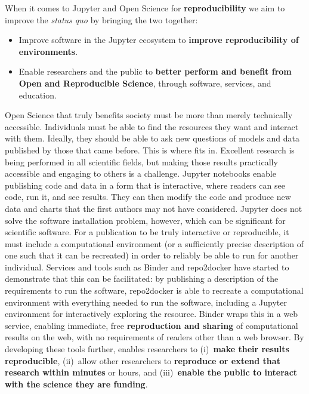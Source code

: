 When it comes to Jupyter and Open Science for \textbf{reproducibility} we aim to improve the
\textit{status quo} by bringing the two together:

\begin{itemize}
\item Improve software in the Jupyter ecosystem to \textbf{improve reproducibility of environments}.
\item Enable researchers and the public to \textbf{better perform and benefit
  from Open and Reproducible Science}, through software, services, and education.
\end{itemize}


Open Science that truly benefits society must be more than merely
technically accessible.  Individuals must be able to find the
resources they want and interact with them.  Ideally, they should be
able to ask new questions of models and data published by those that
came before.  This is where \TheProject fits in.  Excellent research
is being performed in all scientific fields, but making those results
practically accessible and engaging to others is a challenge.
Jupyter notebooks enable publishing code and data in a form that is
interactive, where readers can see code, run it, and see results.
They can then modify the code and produce new data and charts that the
first authors may not have considered.  Jupyter does not solve the
software installation problem, however, which can be significant for
scientific software.  For a publication to be truly interactive or
reproducible, it must include a computational environment (or a
sufficiently precise description of one such that it can be recreated)
in order to reliably be able to run for another individual.  Services
and tools such as Binder and repo2docker have started to demonstrate
that this can be facilitated: by
publishing a description of the requirements to run the software,
repo2docker is able to recreate a computational environment with
everything needed to run the software, including a Jupyter
environment for interactively exploring the resource.  Binder wraps
this in a web service, enabling immediate, free \textbf{reproduction and sharing} of
computational results on the web, with no requirements of readers
other than a web browser.
By developing these tools further, \TheProject enables researchers to
(i)~\textbf{make their results reproducible},
(ii)~allow other researchers to \textbf{reproduce or extend that research within minutes} or hours,
and (iii)~\textbf{enable the public to interact with the
science they are funding}.

